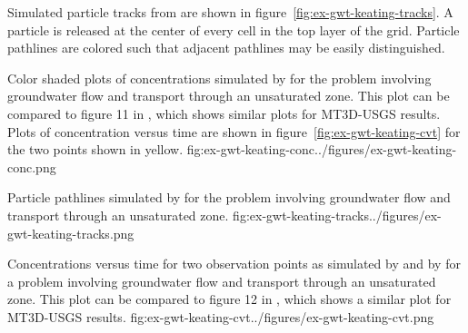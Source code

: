 Simulated particle tracks from \mf are shown in figure~\ref{fig:ex-gwt-keating-tracks}.  A particle is released at the center of every cell in the top layer of the grid.  Particle pathlines are colored such that adjacent pathlines may be easily distinguished.

\begin{StandardFigure}{
                                     Color shaded plots of concentrations simulated by \mf for the \cite{keating2009stable} problem involving groundwater flow and transport through an unsaturated zone.  This plot can be compared to figure 11 in \cite{mt3dusgs}, which shows similar plots for MT3D-USGS results.  Plots of concentration versus time are shown in figure~\ref{fig:ex-gwt-keating-cvt} for the two points shown in yellow.
                                     }{fig:ex-gwt-keating-conc}{../figures/ex-gwt-keating-conc.png}
\end{StandardFigure}                                  

\begin{StandardFigure}{
                                    Particle pathlines simulated by \mf for the \cite{keating2009stable} problem involving groundwater flow and transport through an unsaturated zone.  
                                    }{fig:ex-gwt-keating-tracks}{../figures/ex-gwt-keating-tracks.png}
\end{StandardFigure}      

\begin{StandardFigure}{
                                     Concentrations versus time for two observation points as simulated by \mf and by \cite{keating2009stable} for a problem involving groundwater flow and transport through an unsaturated zone.  This plot can be compared to figure 12 in \cite{mt3dusgs}, which shows a similar plot for MT3D-USGS results.
                                     }{fig:ex-gwt-keating-cvt}{../figures/ex-gwt-keating-cvt.png}
\end{StandardFigure}                                  
